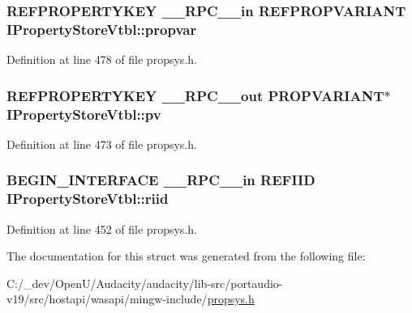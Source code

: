 \subsubsection[{\texorpdfstring{propvar}{propvar}}]{ {\bf R\+E\+F\+P\+R\+O\+P\+E\+R\+T\+Y\+K\+EY} {\bf \+\_\+\+\_\+\+R\+P\+C\+\_\+\+\_\+in} {\bf R\+E\+F\+P\+R\+O\+P\+V\+A\+R\+I\+A\+NT} I\+Property\+Store\+Vtbl\+::propvar}\hypertarget{struct_i_property_store_vtbl_aad5161e11623116857bbbcb75efbc318}{}\label{struct_i_property_store_vtbl_aad5161e11623116857bbbcb75efbc318}


Definition at line 478 of file propsys.\+h.

\subsubsection[{\texorpdfstring{pv}{pv}}]{ {\bf R\+E\+F\+P\+R\+O\+P\+E\+R\+T\+Y\+K\+EY} {\bf \+\_\+\+\_\+\+R\+P\+C\+\_\+\+\_\+out} {\bf P\+R\+O\+P\+V\+A\+R\+I\+A\+NT}$\ast$ I\+Property\+Store\+Vtbl\+::pv}\hypertarget{struct_i_property_store_vtbl_ab9b082ceebbf24e7d85f7865e2ddb40d}{}\label{struct_i_property_store_vtbl_ab9b082ceebbf24e7d85f7865e2ddb40d}


Definition at line 473 of file propsys.\+h.

\subsubsection[{\texorpdfstring{riid}{riid}}]{\setlength{\rightskip}{0pt plus 5cm}B\+E\+G\+I\+N\+\_\+\+I\+N\+T\+E\+R\+F\+A\+CE {\bf \+\_\+\+\_\+\+R\+P\+C\+\_\+\+\_\+in} {\bf R\+E\+F\+I\+ID} I\+Property\+Store\+Vtbl\+::riid}\hypertarget{struct_i_property_store_vtbl_a7bf5f41e9ba97dfc1e17a166a25fd080}{}\label{struct_i_property_store_vtbl_a7bf5f41e9ba97dfc1e17a166a25fd080}


Definition at line 452 of file propsys.\+h.



The documentation for this struct was generated from the following file\+:\begin{DoxyCompactItemize}
\item 
C\+:/\+\_\+dev/\+Open\+U/\+Audacity/audacity/lib-\/src/portaudio-\/v19/src/hostapi/wasapi/mingw-\/include/\hyperlink{propsys_8h}{propsys.\+h}\end{DoxyCompactItemize}
